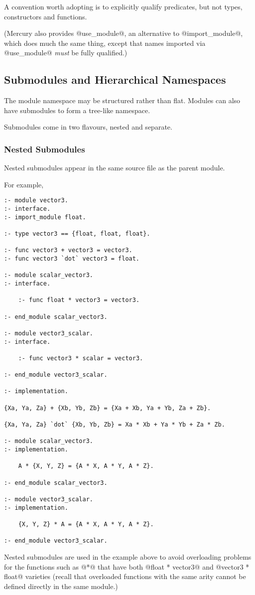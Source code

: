 A convention worth adopting is to explicitly qualify
predicates, but not types, constructors and functions.

(Mercury also provides @use_module@, an alternative to @import_module@,
which does much the same thing, except that names imported via
@use_module@ \emph{must} be fully qualified.)

\subsection{Submodules and Hierarchical Namespaces}

The module namespace may be structured rather than flat.  Modules can
also have submodules to form a tree-like namespace.

Submodules come in two flavours, nested and separate.

\subsubsection{Nested Submodules}

Nested submodules appear in the same source file as the parent module.

For example,
\begin{verbatim}
:- module vector3.
:- interface.
:- import_module float.

:- type vector3 == {float, float, float}.

:- func vector3 + vector3 = vector3.
:- func vector3 `dot` vector3 = float.

:- module scalar_vector3.
:- interface.

    :- func float * vector3 = vector3.

:- end_module scalar_vector3.

:- module vector3_scalar.
:- interface.

    :- func vector3 * scalar = vector3.

:- end_module vector3_scalar.
    
:- implementation.

{Xa, Ya, Za} + {Xb, Yb, Zb} = {Xa + Xb, Ya + Yb, Za + Zb}.

{Xa, Ya, Za} `dot` {Xb, Yb, Zb} = Xa * Xb + Ya * Yb + Za * Zb.

:- module scalar_vector3.
:- implementation.

    A * {X, Y, Z} = {A * X, A * Y, A * Z}.

:- end_module scalar_vector3.

:- module vector3_scalar.
:- implementation.

    {X, Y, Z} * A = {A * X, A * Y, A * Z}.

:- end_module vector3_scalar.
\end{verbatim}
Nested submodules are used in the example above to avoid overloading
problems for the functions such as @*@ that have both @float * vector3@
and @vector3 * float@ varieties (recall that overloaded functions with
the same arity cannot be defined directly in the same module.)

